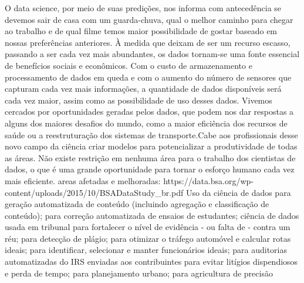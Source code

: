 O data science, por meio de suas predições, nos informa com antecedência se devemos sair de casa com um guarda-chuva, qual o melhor caminho para chegar ao trabalho e de qual filme temos maior possibilidade de gostar baseado em nossas preferências anteriores. À medida que deixam de ser um recurso escasso, passando a ser cada vez mais abundantes, os dados tornam-se uma fonte essencial de benefícios sociais e econômicos.
Com o custo de armazenamento e processamento de dados em queda e com o aumento do número de sensores que capturam cada vez mais informações, a quantidade de dados disponíveis será cada vez maior, assim como as possibilidade de uso desses dados. Vivemos cercados por oportunidades geradas pelos dados, que podem nos dar respostas a alguns dos maiores desafios do mundo, como a maior eficiência dos recursos de saúde ou a reestruturação dos sistemas de transporte.Cabe aos profissionais desse novo campo da ciência criar modelos para potencializar a produtividade de todas as áreas. Não existe restrição em nenhuma área para o trabalho dos cientistas de dados, o que é uma grande oportunidade para tornar o esforço humano cada vez mais eficiente.
areas afetadas e melhoradas: https://data.bsa.org/wp-content/uploads/2015/10/BSADataStudy_br.pdf
Uso da ciência de dados para geração automatizada de conteúdo (incluindo agregação e classificação de conteúdo); para correção automatizada de ensaios de estudantes; ciência de dados usada em tribunal para fortalecer o nível de evidência - ou falta de - contra um réu; para detecção de plágio; para otimizar o tráfego automóvel e calcular rotas ideais; para identificar, selecionar e manter funcionários ideais; para auditorias automatizadas do IRS enviadas aos contribuintes para evitar litígios dispendiosos e perda de tempo; para planejamento urbano; para  agricultura de precisão


